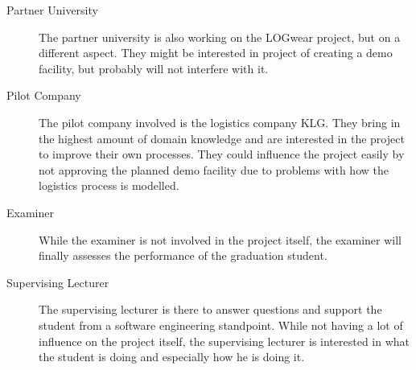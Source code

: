 \begin{description}
	\item[Partner University] \hfill
	
	The partner university is also working on the LOGwear project, but on a different aspect. They might be interested in project of creating a demo facility, but probably will not interfere with it.
	\item[Pilot Company] \hfill
	
	The pilot company involved is the logistics company KLG. They bring in the highest amount of domain knowledge and are interested in the project to improve their own processes. They could influence the project easily by not approving the planned demo facility due to problems with how the logistics process is modelled.
	\item[Examiner] \hfill
	
	While the examiner is not involved in the project itself, the examiner will finally assesses the performance of the graduation student.
	\item[Supervising Lecturer] \hfill
	
	The supervising lecturer is there to answer questions and support the student from a software engineering standpoint. While not having a lot of influence on the project itself, the supervising lecturer is interested in what the student is doing and especially how he is doing it.
\end{description}